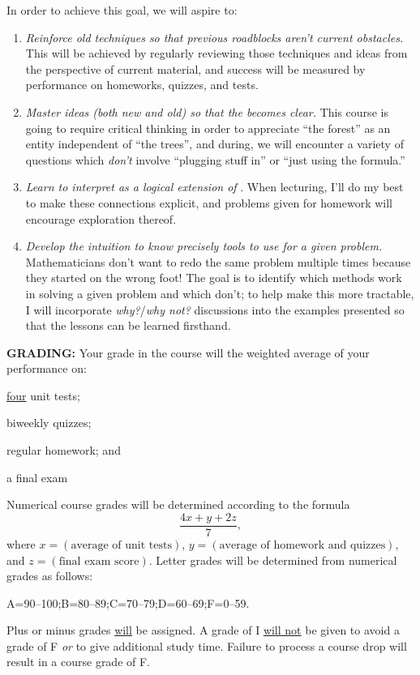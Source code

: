 \documentclass[12pt,oneside]{amsart}
\begin{document}
\noindent In order to achieve this goal, we will aspire to:\vspace{-3mm}
\begin{enumerate}[label=(Obj \arabic*), leftmargin=1in, itemsep=1.5mm]
	\item \textit{Reinforce old techniques so that previous roadblocks aren't current obstacles.} This will be achieved by regularly reviewing those techniques and ideas from the perspective of current material, and success will be measured by performance on homeworks, quizzes, and tests.
	\item \textit{Master ideas (both new and old) so that the {} becomes clear.} This course is going to require critical thinking in order to appreciate ``the forest'' as an entity independent of ``the trees'', and during, we will encounter a variety of questions which \textit{don't} involve ``plugging stuff in'' or ``just using the formula.''
	\item \textit{Learn to interpret {} as a logical extension of {}}. When lecturing, I'll do my best to make these connections explicit, and problems given for homework will encourage exploration thereof.
	\item \textit{Develop the intuition to know precisely {} tools to use for a given problem.} Mathematicians don't want to redo the same problem multiple times because they started on the wrong foot! The goal is to identify which methods work in solving a given problem and which don't; to help make this more tractable, I will incorporate \textit{why?}/\textit{why not?} discussions into the examples presented so that the lessons can be learned firsthand.
\end{enumerate}

\vspace{12pt}

\noindent \textbf{GRADING:} Your grade in the course will the weighted average of your performance on: \begin{enumerate*}[label=(\alph*)]\item \ul{four} unit tests; \item biweekly quizzes; \item regular homework; and \item a final exam\end{enumerate*}

\noindent Numerical course grades will be determined according to the formula
$$\frac{4x+y+2z}{7},$$
where $x=(\text{average of unit tests})$, $y=(\text{average of homework and quizzes})$, and $z=(\text{final exam score})$. Letter grades will be determined from numerical grades as follows: \vspace{-3mm}
\begin{center}
	A=90--100;\quad\quad\quad B=80--89;\quad\quad\quad C=70--79;\quad\quad\quad D=60--69;\quad\quad\quad F=0--59.
\end{center}\vspace{-3mm}
Plus or minus grades \ul{will} be assigned. A grade of I \ul{will not} be given to avoid a grade of F \textit{or} to give additional study time. Failure to process a course drop will result in a course grade of F.
\end{document}
